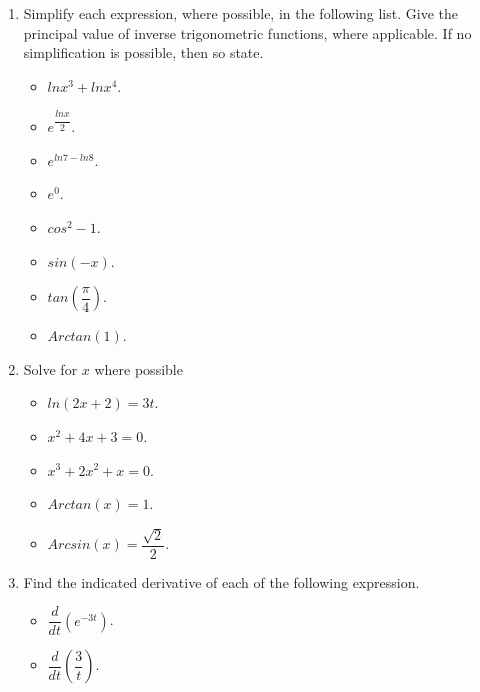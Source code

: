 \documentclass[fleqn]{article}
\begin{document}
  \begin{enumerate}
    \item Simplify each expression, where possible, in the following list. Give the
    principal value of inverse trigonometric functions, where applicable. If no
    simplification is possible, then so state.

    \begin{itemize}
      \item $ln x^3+ln x^4$.

      \item $e^{\dfrac{ln x}{2}}$.

      \item $e^{ln 7-ln 8}$.

      \item $e^0$.

      \item $cos^{2}-1$.

      \item $sin(-x)$.

      \item $tan(\dfrac{\pi}{4})$.

      \item $Arctan(1)$.

    \end{itemize}


    \item Solve for $x$ where possible
    \begin{itemize}
      \item $ln(2x+2)=3t$.

      \item $x^2+4x+3=0$.

      \item $x^3+2x^2+x=0$.

      \item $Arctan (x)=1$.

      \item $Arcsin (x)=\dfrac{\sqrt{2}}{2}$.

    \end{itemize}

    \item Find the indicated derivative of each of the following expression.
    \begin{itemize}
      \item $\dfrac{d}{dt} \left(e^{-3t}\right)$.

      \item $\dfrac{d}{dt} \left(\dfrac{3}{t}\right)$.


\end{itemize}
\end{enumerate}
\end{document}
